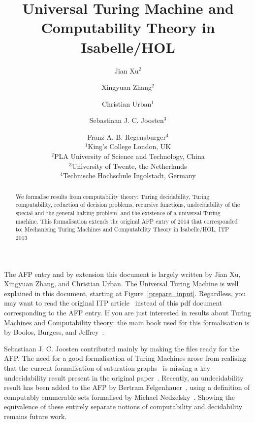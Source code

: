 \documentclass{report}
\def\inst#1{\unskip$^{#1}$}
\begin{document}
\title{Universal Turing Machine and Computability Theory in Isabelle/HOL}
\author{Jian Xu\inst{2} \and Xingyuan Zhang\inst{2} \and Christian Urban\inst{1}
 \and Sebastiaan J. C. Joosten\inst{3}
 \and Franz A. B. Regensburger\inst{4} \vspace{3pt} \\
\inst{1}King's College London, UK \\
\inst{2}PLA University of Science and Technology, China \\
\inst{3}University of Twente, the Netherlands \\
\inst{4}Technische Hochschule Ingolstadt, Germany}

\maketitle

\begin{abstract}
We formalise results from computability theory: Turing decidability, Turing
  computability, reduction of decision problems, recursive functions,
  undecidability of the special and the general halting problem, and the
  existence of a universal Turing machine.  This formalisation extends the
  original AFP entry of 2014 that corresponded to: Mechanising Turing Machines
  and Computability Theory in Isabelle/HOL, ITP 2013
\end{abstract}

The AFP entry and by extension this document is largely written by Jian Xu,
Xingyuan Zhang, and Christian Urban.  The Universal Turing Machine is well
explained in this document, starting at Figure~\ref{prepare_input}.
Regardless, you may want to read the original ITP article~\cite{Xu13} instead of
 this pdf document corresponding to the AFP entry.
If you are just interested in results about Turing Machines and Computability theory:
the main book used for this formalisation is by Boolos, Burgess, and Jeffrey~\cite{Boolos07}.

Sebastiaan J. C. Joosten contributed mainly by making the files ready for the
AFP.  The need for a good formalisation of Turing Machines arose from realising
that the current formalisation of saturation graphs~\cite{Graph_Saturation-AFP}
is missing a key undecidability result present in the original
paper~\cite{Joosten18}.
Recently, an undecidability result has been added to the AFP by
 Bertram Felgenhauer~\cite{Minsky_Machines-AFP}, using a definition of computably enumerable
 sets formalised by Michael Nedzelsky~\cite{Recursion-Theory-I-AFP}.
Showing the equivalence of these entirely separate notions of computability
 and decidability remains future work.
\end{document}
